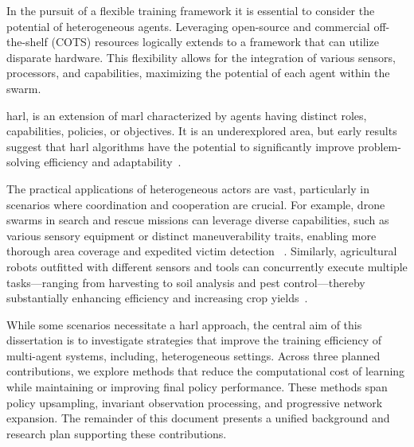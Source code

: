 In the pursuit of a flexible training framework
it is essential to consider the potential of heterogeneous agents. 
Leveraging open-source and commercial off-the-shelf (COTS) resources 
logically extends to a framework that can utilize disparate hardware. 
This flexibility allows for the integration of various sensors, processors, 
and capabilities, maximizing the potential of each agent within the swarm. 

\Gls{harl}, is an extension of \gls{marl} characterized by agents having 
distinct roles, capabilities, policies, or objectives. It is an 
underexplored area, but early results suggest that \gls{harl} algorithms
have the potential to significantly improve problem-solving efficiency 
and adaptability~\cite{calvo2018}.

The practical applications of heterogeneous actors are vast, particularly in 
scenarios where coordination and cooperation are crucial. For example, 
drone swarms in search and rescue missions can leverage diverse capabilities, 
such as various sensory equipment or distinct maneuverability traits, 
enabling more thorough area coverage and expedited victim detection
~\cite{hoang2023,kouzeghar2023}.
Similarly, agricultural robots outfitted with different sensors and tools can 
concurrently execute multiple tasks—ranging from harvesting to soil analysis and
pest control—thereby substantially enhancing efficiency and increasing crop 
yields~\cite{carbone2018,amarasinghe2019}.

While some scenarios necessitate a \gls{harl} approach, the central aim of 
this dissertation is to investigate strategies that improve the training 
efficiency of multi-agent systems, including, heterogeneous settings. 
Across three planned contributions, we explore methods that reduce the 
computational cost of learning while maintaining or improving final policy 
performance. These methods span policy upsampling, invariant observation processing, 
and progressive network expansion. The remainder of this document 
presents a unified background and research plan supporting these contributions.


